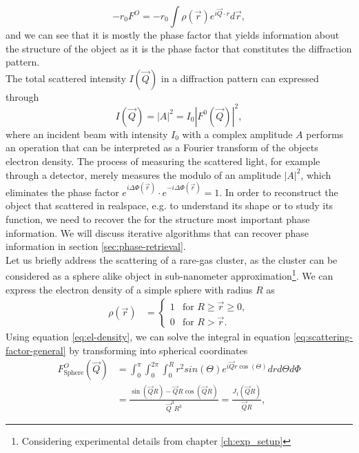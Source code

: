 \begin{equation}
-r_{0}F^{O}=-r_{0}\int \rho\left(\vec{r}\right) e^{i \vec{Q}\cdot r}d\vec{r},
\label{eq:scattering-factor-general}
\end{equation}
and we can see that it is mostly the phase factor that yields information about the structure of the object as it is the phase factor that constitutes the diffraction pattern.\\
The total scattered intensity $I\left(\vec{Q}\right)$ in a diffraction pattern can expressed through
\begin{equation}
I\left(\vec{Q}\right)=\left|A\right|^{2}=I_{0}\left|F^{0}\left(\vec{Q}\right)\right|^{2},
\label{eq:scattered-intensity}
\end{equation}
where an incident beam with intensity $I_{0}$ with a complex amplitude $A$ performs an operation that can be interpreted as a Fourier transform of the objects electron density. The process of measuring the scattered light, for example through a detector, merely measures the modulo of an amplitude $\left|A\right|^{2}$, which eliminates the phase factor $e^{i\Delta\Phi\left(\vec{r}\right)}\cdot e^{-i\Delta\Phi\left(\vec{r}\right)}=1$. In order to reconstruct the object that scattered in realspace, e.g. to understand its shape or to study its function, we need to recover the for the structure most important phase information. We will discuss iterative algorithms that can recover phase information in section \ref{sec:phase-retrieval}.\\
Let us briefly address the scattering of a rare-gas cluster, as the cluster can be considered as a sphere alike object in sub-nanometer approximation\footnote{Considering experimental details from chapter \ref{ch:exp_setup}}. We can express the electron density of a simple sphere with radius $R$ as 
\begin{align}
\rho\left(\vec{r}\right)&=\begin{cases}
1& \text{for $R \geq \vec{r} \geq 0$},\\
0&\text{for $R > \vec{r}$}.
\end{cases}
\label{eq:el-density}
\end{align}
Using equation \eqref{eq:el-density}, we can solve the integral in equation \eqref{eq:scattering-factor-general} by transforming into spherical coordinates
\begin{align}
F_{\text{Sphere}}^{O}\left(\vec{Q}\right) &= \int_{0}^{\pi}\int_{0}^{2\pi}\int_{0}^{R} r^{2}  sin\left(\Theta\right) e^{i \vec{Q} r \cos\left(\Theta\right)} dr d\Theta d\Phi\\
&=\frac{\sin\left(\vec{Q} R\right)-\vec{Q} R\cos\left(\vec{Q} R\right)}{\vec{Q}^{3} R^{3}}=\frac{J_{1}\left(\vec{Q}R\right)}{\vec{Q}R},
\label{eq:scattering from sphere}
\end{align}
